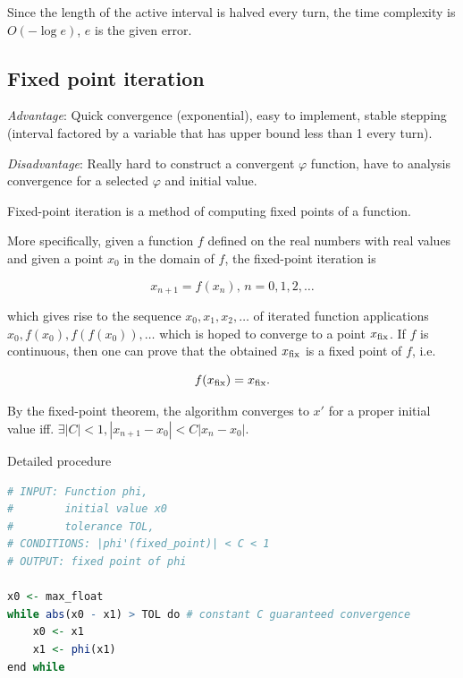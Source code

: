 \documentclass{article}
\begin{document}
Since the length of the active interval is halved every turn, the time complexity is $O(-\log e)$, $e$ is the given error.\par


\subsection{Fixed point iteration}

\emph{Advantage}: Quick convergence (exponential), easy to implement, stable stepping (interval factored by a variable that has upper bound less than 1 every turn).

\emph{Disadvantage}: Really hard to construct a convergent $\varphi$ function, have to analysis convergence for a selected $\varphi$ and initial value.

\sepline

Fixed-point iteration is a method of computing fixed points of a function.\cite{fixedpoint}

More specifically, given a function ${\displaystyle f}$ defined on the real numbers with real values and given a point ${\displaystyle x_{0}}$ in the domain of $\displaystyle f$, the fixed-point iteration is

$$\displaystyle x_{n+1}=f(x_{n}),\,n=0,1,2,\dots $$

which gives rise to the sequence $\displaystyle x_{0},x_{1},x_{2},\dots $ of iterated function applications $\displaystyle x_{0},f(x_{0}),f(f(x_{0})),\dots $ which is hoped to converge to a point $\displaystyle x_{\rm {fix}}$. If $\displaystyle f$ is continuous, then one can prove that the obtained $\displaystyle x_{\rm {fix}}$ is a fixed point of $\displaystyle f$, i.e.

$$\displaystyle f(x_{\rm {fix}})=x_{\rm {fix}}.$$

By the fixed-point theorem, the algorithm converges to $x'$ for a proper initial value iff. $\exists |C|<1, |x_{n+1}-x_0|<C|x_n-x_0|$.

Detailed procedure

\begin{lstlisting}[language=R, caption=Fixed point Algorithm]
# INPUT: Function phi, 
#        initial value x0
#        tolerance TOL, 
# CONDITIONS: |phi'(fixed_point)| < C < 1
# OUTPUT: fixed point of phi

x0 <- max_float
while abs(x0 - x1) > TOL do # constant C guaranteed convergence
    x0 <- x1
    x1 <- phi(x1)
end while
\end{lstlisting}
\end{document}
